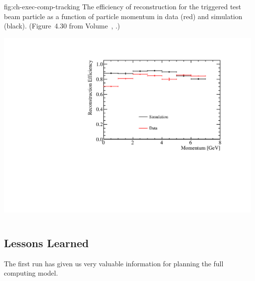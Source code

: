 \begin{dunefigure}
{fig:ch-exec-comp-tracking}
{The efficiency of reconstruction for the triggered test beam particle as a function of particle
momentum in data (red) and simulation (black). (Figure~4.30 from Volume~\volnumberphysics{}, \voltitlephysics{}.)}
\includegraphics[height=4in]{graphics/BeamParticleEfficiencyVsMomentum.pdf}
\end{dunefigure}

\subsection{Lessons Learned}
The first  run has given us very valuable information for planning the full  computing model. 

